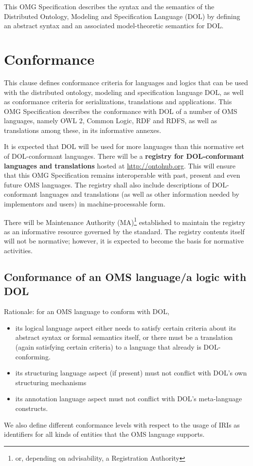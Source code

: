 \documentclass[10pt,%
\ifpretendfinal
final%
\else
draft%
\fi,
]{scrreprt}
\newcommand*{\IS}{OMG Specification\xspace}
\newcommand{\sclause}[1]{\section{#1}}
\begin{document}
This \IS describes the syntax and the semantics of the Distributed Ontology, Modeling and
Specification Language (DOL) by defining an abstract syntax and an associated model-theoretic
semantics for DOL. 


\chapter{Conformance}

This clause defines conformance criteria for languages and logics that can be used with the
distributed ontology, modeling and specification language DOL, as well as conformance criteria for
serializations, translations and applications. This \IS describes the conformance with DOL of a
number of OMS languages, namely OWL 2, Common Logic, RDF and RDFS, as well as translations among
these, in its informative annexes.

It is expected that DOL will be used for more languages than this normative set of DOL-conformant
languages. There will be a \textbf{registry for DOL-conformant languages and translations} hosted
at \url{http://ontohub.org}.  This will ensure that this \IS remains interoperable with past,
present and even future OMS languages.  The registry shall also include descriptions of
DOL-conformant languages and translations (as well as other information needed by implementors
and users) in machine-processable form.  

There will be Maintenance Authority (MA)\footnote{or, depending on advisability, a Registration
Authority} established to maintain the registry as an informative resource governed by the
standard.  The registry contents itself will not be normative; however, it is 
expected to become the basis for normative activities.


\sclause{Conformance of an OMS language/a logic with DOL}\label{c:conform:logic}

Rationale: for an OMS language to conform with DOL,
\begin{itemize}
\item its logical language aspect either needs to satisfy certain criteria about its abstract
syntax or formal semantics itself, or there must be a translation (again satisfying certain
criteria) to a language that already is DOL-conforming.
\item its structuring language aspect (if present) must not conflict with DOL's own structuring
mechanisms
\item its annotation language aspect must not conflict with DOL's meta-language constructs.
\end{itemize}
We also define different conformance levels with respect to the usage of IRIs as identifiers for all kinds
of entities that the OMS language supports.
\end{document}
